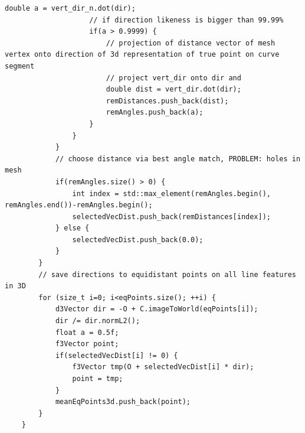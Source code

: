 \begin{lstlisting}[label=some-code, caption=Point Projection]
                    double a = vert_dir_n.dot(dir);
                    // if direction likeness is bigger than 99.99%
                    if(a > 0.9999) {
                        // projection of distance vector of mesh vertex onto direction of 3d representation of true point on curve segment
                        // project vert_dir onto dir and 
                        double dist = vert_dir.dot(dir);
                        remDistances.push_back(dist);
                        remAngles.push_back(a);
                    }
                }
            }
            // choose distance via best angle match, PROBLEM: holes in mesh
            if(remAngles.size() > 0) {
                int index = std::max_element(remAngles.begin(), remAngles.end())-remAngles.begin();
                selectedVecDist.push_back(remDistances[index]);      
            } else {
                selectedVecDist.push_back(0.0);
            }
        }
        // save directions to equidistant points on all line features in 3D
        for (size_t i=0; i<eqPoints.size(); ++i) {
            d3Vector dir = -O + C.imageToWorld(eqPoints[i]);
            dir /= dir.normL2();
            float a = 0.5f;
            f3Vector point;
            if(selectedVecDist[i] != 0) {
                f3Vector tmp(O + selectedVecDist[i] * dir);
                point = tmp;
            }
            meanEqPoints3d.push_back(point);
        }
    }
\end{lstlisting}

